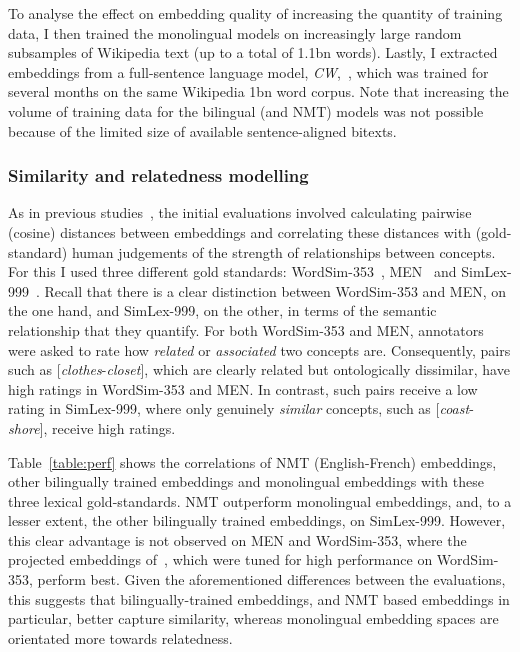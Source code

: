 To analyse the effect on embedding quality of increasing the quantity of training data, I then trained the monolingual models on increasingly large random subsamples of Wikipedia text (up to a total of 1.1bn words). Lastly, I extracted embeddings from a full-sentence language model, \emph{CW},~\citep{collobert2008unified}, which was trained for several months on the same Wikipedia 1bn word corpus. Note that increasing the volume of training data for the bilingual (and NMT) models was not possible because of the limited size of available sentence-aligned bitexts. 
 
\subsubsection{Similarity and relatedness modelling}

As in previous studies~\citep{Agirre2009,bruni2014multimodal,baroni2014don}, the initial evaluations involved calculating pairwise (cosine) distances between embeddings and correlating these distances with (gold-standard) human judgements of the strength of relationships between concepts. For this I used three different gold standards: WordSim-353~\citep{Agirre2009}, MEN~\citep{bruni2014multimodal} and SimLex-999~\citep{hill2014simlex}. Recall that there is a clear distinction between WordSim-353 and MEN, on the one hand, and SimLex-999, on the other, in terms of the semantic relationship that they quantify. For both WordSim-353 and MEN, annotators were asked to rate how \emph{related} or \emph{associated} two concepts are. Consequently, pairs such as [\emph{clothes}-\emph{closet}], which are clearly related but ontologically dissimilar, have high ratings in WordSim-353 and MEN. In contrast, such pairs receive a low rating in SimLex-999, where only genuinely \emph{similar} concepts, such as [\emph{coast}- \emph{shore}], receive high ratings. 

Table~\ref{table:perf} shows the correlations of NMT (English-French) embeddings, other bilingually trained embeddings and monolingual embeddings with these three lexical gold-standards. NMT outperform monolingual embeddings, and, to a lesser extent, the other bilingually trained embeddings, on SimLex-999. However, this clear advantage is not observed on MEN and WordSim-353, where the projected embeddings of~\cite{faruqui2014improving}, which were tuned for high performance on WordSim-353, perform best. Given the aforementioned differences between the evaluations, this suggests that bilingually-trained embeddings, and NMT based embeddings in particular, better capture similarity, whereas monolingual embedding spaces are orientated more towards relatedness. 

